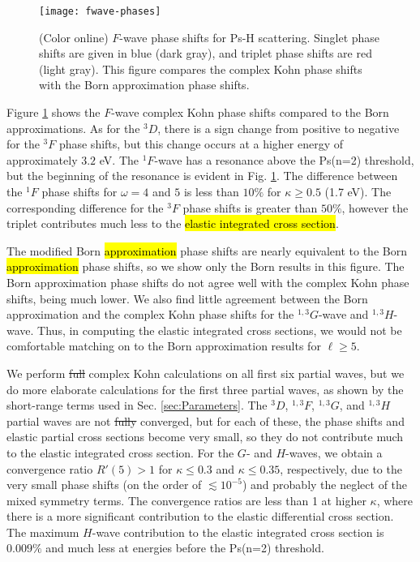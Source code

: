 \documentclass[preprint,showpacs,showkeys,preprintnumbers,amsmath,amssymb,longbibliography,pra,aps]{revtex4-1}
\begin{document}
{\begin{figure}[H]
	\centering
	\texttt{[image: fwave-phases]}
	\caption{(Color online) $F$-wave phase shifts for Ps-H scattering.
Singlet phase shifts are given in blue
(dark gray), and triplet phase shifts are red (light gray). This figure
compares the complex Kohn phase shifts with the Born approximation phase shifts.}
	\label{fig:fwave-phases}
\end{figure}

Figure \ref{fig:fwave-phases} shows the $F$-wave complex Kohn phase shifts 
compared to the Born approximations. As for the $^3D$, there is a sign change 
from positive to negative for the $^3F$ phase shifts, but this change 
occurs at a higher energy of approximately $3.2$ eV. The $^1F$-wave has a 
resonance above the Ps(n=2) threshold, but the beginning of the resonance is 
evident in Fig. \ref{fig:fwave-phases}. The difference between the $^1F$ phase
shifts for $\omega = 4$ and $5$ is less than $10\%$ for $\kappa \geq 0.5$
(1.7 eV). The corresponding difference for the $^3F$ phase shifts is greater
than $50\%$, however the triplet contributes much less to the 
\hl{elastic integrated cross section}.

The modified Born \hl{approximation} phase shifts are nearly equivalent to
the Born \hl{approximation} 
phase shifts, so we show only the Born results in this figure.
The Born approximation phase shifts do
not agree well with the complex Kohn phase shifts, being much lower. We 
also find little agreement between the Born approximation and the complex 
Kohn phase shifts for the $^{1,3}G$-wave and $^{1,3}H$-wave. Thus, in 
computing the elastic integrated cross sections, we would not be comfortable 
matching on to the Born approximation results for $\ell \geq 5$.

We perform \sout{full} complex Kohn calculations on all first six partial waves, but 
we do more elaborate calculations for the first three partial waves, as shown 
by the short-range terms used in Sec. \ref{sec:Parameters}. The $^3D$, $^{1,3}F$,
$^{1,3}G$, and $^{1,3}H$ partial waves are not \sout{fully} converged, but for each of
these, the phase shifts and elastic partial cross 
sections become very small, so they do not contribute much to the elastic
integrated cross section.
For the $G$- and $H$-waves, we obtain a convergence ratio $R'(5) > 1$ for
$\kappa \leq 0.3$ and $\kappa \leq 0.35$, respectively, due to the very small
phase shifts (on the order of $\lesssim 10^{-5}$) and probably the neglect of
the mixed symmetry terms. The convergence ratios
are less than 1 at higher $\kappa$, where there is a more significant
contribution to the elastic differential cross section.
The maximum $H$-wave contribution to the elastic integrated cross
section is $0.009\%$ and much less at energies before the Ps(n=2)
threshold.

}
\end{document}
